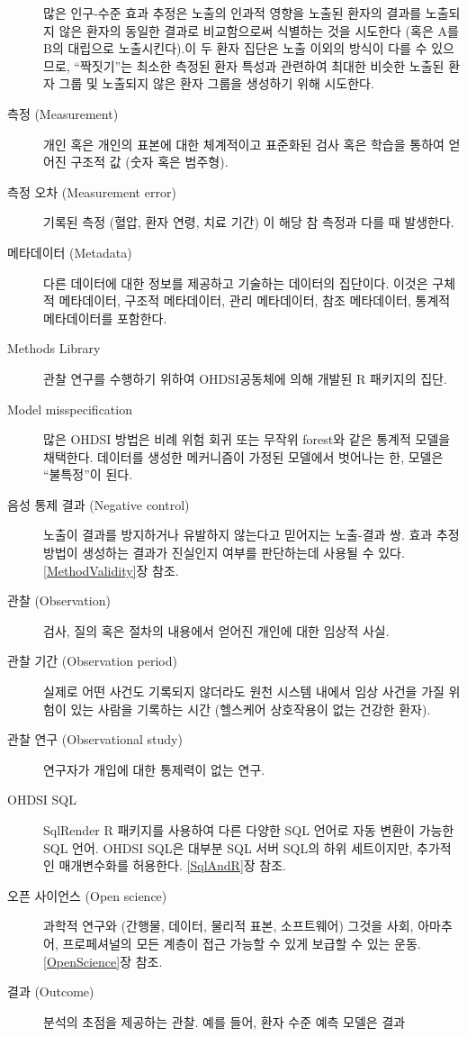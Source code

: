 \documentclass[11pt]{book}
\theoremstyle{definition}
\theoremstyle{definition}
\theoremstyle{definition}
\theoremstyle{remark}
\begin{document}
\begin{description}
많은 인구-수준 효과 추정은 노출의 인과적 영향을 노출된 환자의 결과를
노출되지 않은 환자의 동일한 결과로 비교함으로써 식별하는 것을 시도한다
(혹은 A를 B의 대립으로 노출시킨다).이 두 환자 집단은 노출 이외의 방식이
다를 수 있으므로, ``짝짓기''는 최소한 측정된 환자 특성과 관련하여 최대한
비슷한 노출된 환자 그룹 및 노출되지 않은 환자 그룹을 생성하기 위해
시도한다.
\item[측정 (Measurement)]
개인 혹은 개인의 표본에 대한 체계적이고 표준화된 검사 혹은 학습을 통하여
얻어진 구조적 값 (숫자 혹은 범주형).
\item[측정 오차 (Measurement error)]
기록된 측정 (혈압, 환자 연령, 치료 기간) 이 해당 참 측정과 다를 때
발생한다.
\item[메타데이터 (Metadata)]
다른 데이터에 대한 정보를 제공하고 기술하는 데이터의 집단이다. 이것은
구체적 메타데이터, 구조적 메타데이터, 관리 메타데이터, 참조 메타데이터,
통계적 메타데이터를 포함한다.
\item[Methods Library]
관찰 연구를 수행하기 위하여 OHDSI공동체에 의해 개발된 R 패키지의 집단.
\item[Model misspecification]
많은 OHDSI 방법은 비례 위험 회귀 또는 무작위 forest와 같은 통계적 모델을
채택한다. 데이터를 생성한 메커니즘이 가정된 모델에서 벗어나는 한, 모델은
``불특정''이 된다.
\item[음성 통제 결과 (Negative control)]
노출이 결과를 방지하거나 유발하지 않는다고 믿어지는 노출-결과 쌍. 효과
추정 방법이 생성하는 결과가 진실인지 여부를 판단하는데 사용될 수 있다.
\ref{MethodValidity}장 참조.
\item[관찰 (Observation)]
검사, 질의 혹은 절차의 내용에서 얻어진 개인에 대한 임상적 사실.
\item[관찰 기간 (Observation period)]
실제로 어떤 사건도 기록되지 않더라도 원천 시스템 내에서 임상 사건을 가질
위험이 있는 사람을 기록하는 시간 (헬스케어 상호작용이 없는 건강한 환자).
\item[관찰 연구 (Observational study)]
연구자가 개입에 대한 통제력이 없는 연구.
\item[OHDSI SQL]
SqlRender R 패키지를 사용하여 다른 다양한 SQL 언어로 자동 변환이 가능한
SQL 언어. OHDSI SQL은 대부분 SQL 서버 SQL의 하위 세트이지만, 추가적인
매개변수화를 허용한다. \ref{SqlAndR}장 참조.
\item[오픈 사이언스 (Open science)]
과학적 연구와 (간행물, 데이터, 물리적 표본, 소프트웨어) 그것을 사회,
아마추어, 프로페셔널의 모든 계층이 접근 가능할 수 있게 보급할 수 있는
운동. \ref{OpenScience}장 참조.
\item[결과 (Outcome)]
분석의 초점을 제공하는 관찰. 예를 들어, 환자 수준 예측 모델은 결과

\end{description}
\end{document}
